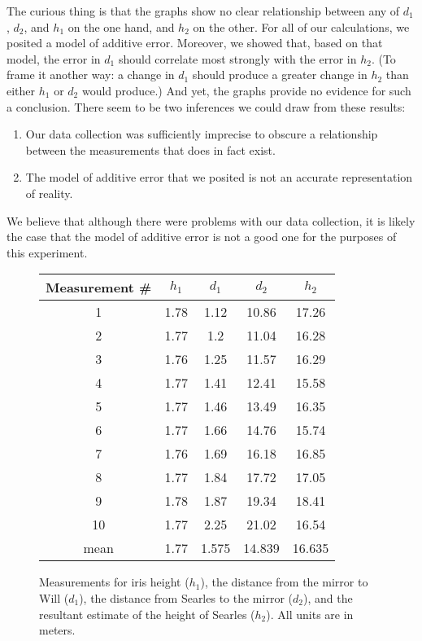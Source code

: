 \documentclass[11pt]{article}
\begin{document}
The curious thing is that the graphs show no clear relationship between any of $d_1$, $d_2$, and $h_1$ on the one hand, and $h_2$ on the other. For all of our calculations, we posited a model of additive error. Moreover, we showed that, based on that model, the error in $d_1$ should correlate most strongly with the error in $h_2$. (To frame it another way: a change in $d_1$ should produce a greater change in $h_2$ than either $h_1$ or $d_2$ would produce.) And yet, the graphs provide no evidence for such a conclusion. There seem to be two inferences we could draw from these results:
\begin{enumerate}
\item Our data collection was sufficiently imprecise to obscure a relationship between the measurements that does in fact exist.
\item The model of additive error that we posited is not an accurate representation of reality.
\end{enumerate}
We believe that although there were problems with our data collection, it is likely the case that the model of additive error is not a good one for the purposes of this experiment.
\begin{figure}
\label{measurements}
\centering
\begin{tabular}{ccccc}
\toprule
Measurement \# & $h_1$ & $d_1$ & $d_2$ & $h_2$ \\
\midrule
1 & 1.78 & 1.12 & 10.86 & 17.26 \\
2 & 1.77 & 1.2 & 11.04 & 16.28 \\
3 & 1.76 & 1.25 & 11.57 & 16.29 \\
4 & 1.77 & 1.41 & 12.41 & 15.58 \\
5 & 1.77 & 1.46 & 13.49 & 16.35 \\
6 & 1.77 & 1.66 & 14.76 & 15.74 \\
7 & 1.76 & 1.69 & 16.18 & 16.85 \\
8 & 1.77 & 1.84 & 17.72 & 17.05 \\
9 & 1.78 & 1.87 & 19.34 & 18.41 \\
10 & 1.77 & 2.25 & 21.02 & 16.54 \\
\midrule
mean & 1.77 & 1.575 & 14.839 & 16.635 \\
\bottomrule
\end{tabular}
\caption{Measurements for iris height ($h_1$), the distance from the mirror to Will ($d_1$), the distance from Searles to the mirror ($d_2$), and the resultant estimate of the height of Searles ($h_2$). All units are in meters.}
\end{figure}




\end{document}

